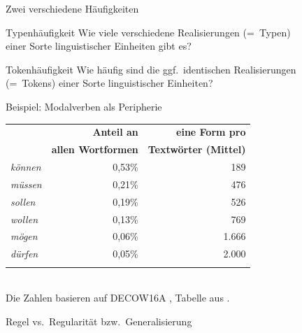 \begin{frame}
  {Zwei verschiedene Häufigkeiten}
  \pause
  \Large\begin{block}{Typenhäufigkeit}
    Wie viele \alert{verschiedene} Realisierungen (=~Typen)\\
    einer Sorte linguistischer Einheiten gibt es?
  \end{block}

  \pause
  \vspace{\baselineskip}
  
  \begin{block}{Tokenhäufigkeit}
    Wie häufig sind die \alert{ggf.\ identischen} Realisierungen\\
    (=~Tokens) einer Sorte linguistischer Einheiten?
  \end{block}
\end{frame}

\begin{frame}
  {Beispiel: Modalverben als Peripherie}
  \pause
  \centering 
    \begin{tabular}{lrr}
    \lsptoprule
    \multirow{2}{*}{\textbf{Modalverb}} & \textbf{Anteil an} & \textbf{eine Form pro}\\
    & \textbf{allen Wortformen} & \textbf{Textwörter (Mittel)}\\
    \midrule
    \textit{können} & 0,53\% &   189 \\
    \textit{müssen} & 0,21\% &   476 \\
    \textit{sollen} & 0,19\% &   526 \\
    \textit{wollen} & 0,13\% &   769 \\
    \textit{mögen}  & 0,06\% & 1.666\\
    \textit{dürfen} & 0,05\% & 2.000\\
    \lspbottomrule
  \end{tabular}\\
  \vspace{\baselineskip}
  \footnotesize Die Zahlen basieren auf DECOW16A \citep{SchaeferBildhauer2012}, Tabelle aus \citet[11]{Schaefer2018}.
\end{frame}

\begin{frame}
  {Regel vs.\ Regularität bzw.\ Generalisierung}
  \pause
  \begin{exe}
    \ex
    \begin{xlist}
      \pause
      \pause
      \pause
      \pause
    \end{xlist}
  \end{exe}
\end{frame}


